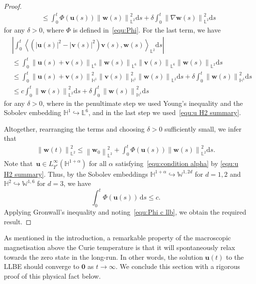 \documentclass[11pt,reqno]{amsart}
\theoremstyle{definition}
\numberwithin{equation}{section}
\newcommand{\bff}{\boldsymbol}
\newcommand{\bb}{\mathbb}
\newcommand{\ds}{\mathrm{d}s}
\newcommand{\nn}{\nonumber}
\newcommand{\norm}[2]{\left\|{#1}\right\|_{#2}}
\newcommand{\inpro}[2]{\left\langle#1,#2\right\rangle}
\begin{document}
\begin{proof}
\begin{align*}
		&\leq 
		\int_0^t \Phi(\bff{u}(s)) \norm{\bff{w}(s)}{\bb{L}^2}^2 \ds
		+
		\delta \int_0^t \norm{\nabla \bff{w}(s)}{\bb{L}^2}^2 \ds 
	\end{align*}
	for any $\delta>0$, where $\Phi$ is defined in~\eqref{equ:Phi}.
	For the last term, we have
	\begin{align}\label{equ:ue ve w llb}
		&\left| \int_0^t \inpro{(|\bff{u}(s)|^2-|\bff{v}(s)|^2)\bff{v}(s)}{\bff{w}(s)}_{\bb{L}^2} \ds \right| 
		\nn\\
		&\leq
		\int_0^t \norm{\bff{u}(s)+\bff{v}(s)}{\bb{L}^6}
		\norm{\bff{w}(s)}{\bb{L}^6}
		\norm{\bff{v}(s)}{\bb{L}^6}
		\norm{\bff{w}(s)}{\bb{L}^2} \ds 
		\nn \\
		&\leq
		\int_0^t \norm{\bff{u}(s)+\bff{v}(s)}{\bb{H}^1}^2
		\norm{\bff{v}(s)}{\bb{H}^1}^2
		\norm{\bff{w}(s)}{\bb{L}^2} \ds 
		+
		\delta \int_0^t \norm{\bff{w}(s)}{\bb{H}^1}^2 \ds 
		\nn \\
		&\leq
		c \int_0^t \norm{\bff{w}(s)}{\bb{L}^2}^2 \ds 
		+
		\delta \int_0^t \norm{\bff{w}(s)}{\bb{H}^1}^2 \ds 
	\end{align}
	for any $\delta>0$, where in the penultimate step we used Young's
	inequality and the Sobolev embedding $\bb{H}^1\hookrightarrow \bb{L}^6$, and
	in the last step we used~\eqref{equ:u H2 summary}. 
	
	Altogether, rearranging the terms and choosing $\delta>0$ sufficiently small, we infer that
	\begin{align*}
		\norm{\bff{w}(t)}{\bb{L}^2}^2
		\leq
		\norm{\bff{w}_0}{\bb{L}^2}^2
		+
		\int_0^t \Phi(\bff{u}(s)) \norm{\bff{w}(s)}{\bb{L}^2}^2 \ds.
	\end{align*}
	Note that~$\bff{u}\in L^\infty_{T^\ast}(\bb{H}^{1+\alpha})$ for all $\alpha$ satisfying~\eqref{equ:condition alpha} by \eqref{equ:u H2 summary}. Thus, by the Sobolev embeddings $\bb{H}^{1+\alpha}\hookrightarrow \bb{W}^{1,2d}$ for $d=1,2$ and $\bb{H}^2\hookrightarrow \bb{W}^{1,6}$ for $d=3$, we have
		\begin{equation}\label{equ:Phi c llb}
			\int_0^t \Phi(\bff{u}(s))\,\ds \le c.
		\end{equation}
	Applying Gronwall's inequality and
	noting~\eqref{equ:Phi c llb}, we obtain the required result.
\end{proof}




As mentioned in the introduction, a remarkable property of the macroscopic magnetisation above the Curie
temperature is that it will spontaneously relax towards the zero state in the
long-run. In other words, the solution $\bff{u}(t)$ to the LLBE
should converge to $\bff{0}$ as $t\to \infty$. We conclude this section with a rigorous proof of this physical fact below.
\end{document}
